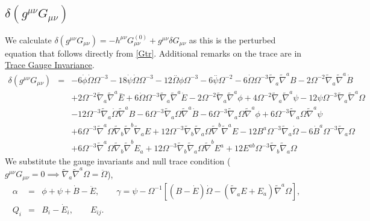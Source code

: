 \documentclass[10pt,letterpaper]{article}
\numberwithin{equation}{section}
\begin{document}
\subsection{$\delta(g^{\mu\nu}G_{\mu\nu})$}
We calculate $\delta (g^{\mu\nu}G_{\mu\nu}) = -h^{\mu\nu}G_{\mu\nu}^{(0)} + g^{\mu\nu}\delta G_{\mu\nu}$ as this is the perturbed equation that follows directly from \eqref{Gtr}. Additional remarks on the trace are in \hyperref[sec:Remark on Trace]{Trace Gauge Invariance}.
\begin{eqnarray}
\delta(g^{\mu\nu} G_{\mu\nu})&=& -6 \dot{\phi} \dot{\Omega} \Omega^{-3} - 18 \dot{\psi} \dot{\Omega} \Omega^{-3} - 12 \overset{..}{\Omega} \phi \Omega^{-3} - 6 \overset{..}{\psi} \Omega^{-2} - 6 \dot{\Omega} \Omega^{-3} \tilde{\nabla}_{a}\tilde{\nabla}^{a}B - 2 \Omega^{-2} \tilde{\nabla}_{a}\tilde{\nabla}^{a}\dot{B} \nonumber \\ 
&& + 2 \Omega^{-2} \tilde{\nabla}_{a}\tilde{\nabla}^{a}\overset{..}{E} + 6 \dot{\Omega} \Omega^{-3} \tilde{\nabla}_{a}\tilde{\nabla}^{a}\dot{E} - 2 \Omega^{-2} \tilde{\nabla}_{a}\tilde{\nabla}^{a}\phi + 4 \Omega^{-2} \tilde{\nabla}_{a}\tilde{\nabla}^{a}\psi - 12 \psi \Omega^{-3} \tilde{\nabla}_{a}\tilde{\nabla}^{a}\Omega \nonumber \\ 
&& - 12 \Omega^{-3} \tilde{\nabla}_{a}\dot{\Omega} \tilde{\nabla}^{a}B - 6 \Omega^{-3} \tilde{\nabla}_{a}\Omega \tilde{\nabla}^{a}\dot{B} - 6 \Omega^{-3} \tilde{\nabla}_{a}\Omega \tilde{\nabla}^{a}\phi + 6 \Omega^{-3} \tilde{\nabla}_{a}\Omega \tilde{\nabla}^{a}\psi \nonumber \\ 
&& + 6 \Omega^{-3} \tilde{\nabla}^{a}\Omega \tilde{\nabla}_{b}\tilde{\nabla}^{b}\tilde{\nabla}_{a}E + 12 \Omega^{-3} \tilde{\nabla}_{b}\tilde{\nabla}_{a}\Omega \tilde{\nabla}^{b}\tilde{\nabla}^{a}E-12 B^{a} \Omega^{-3} \tilde{\nabla}_{a}\dot{\Omega} - 6 \dot{B}^{a} \Omega^{-3} \tilde{\nabla}_{a}\Omega \nonumber \\ 
&& + 6 \Omega^{-3} \tilde{\nabla}^{a}\Omega \tilde{\nabla}_{b}\tilde{\nabla}^{b}E_{a} + 12 \Omega^{-3} \tilde{\nabla}_{b}\tilde{\nabla}_{a}\Omega \tilde{\nabla}^{b}E^{a}+12 E^{ab} \Omega^{-3} \tilde{\nabla}_{b}\tilde{\nabla}_{a}\Omega 
\label{dG}
\end{eqnarray}
We substitute the gauge invariants and null trace condition ($g^{\mu\nu} G_{\mu\nu}=0\implies \tilde\nabla_a\tilde\nabla^a \Omega = \ddot\Omega$),
\begin{eqnarray}
\alpha &=& \phi + \psi +\dot B - \ddot E,\qquad \gamma = \psi -\Omega^{-1}[(B-\dot E)\dot\Omega - (\tilde\nabla_a E + E_a)\tilde\nabla^a \Omega],
\nonumber\\
Q_i&=& B_i - \dot E_i,\qquad E_{ij}.
\end{eqnarray}
\end{document}
